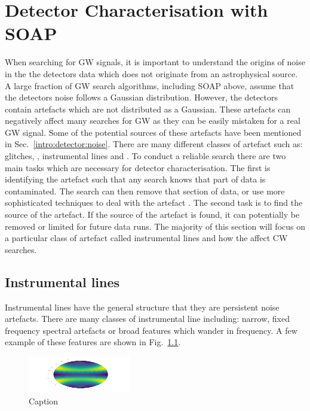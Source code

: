 \chapter{\label{detchar}Detector Characterisation with SOAP}

When searching for \ac{GW} signals, it is important to understand the origins of noise in the the detectors data which does not originate from an astrophysical source.
A large fraction of \ac{GW} search algorithms, including SOAP above, assume that the detectors noise follows a Gaussian distribution.
However, the detectors contain artefacts which are not distributed as a Gaussian. 
These artefacts can negatively affect many searches for \ac{GW} as they can be easily mistaken for a real \ac{GW} signal.
Some of the potential sources of these artefacts have been mentioned in Sec.~\ref{intro:detector:noise}. 
There are many different classes of artefact such as: glitches, , instrumental lines and .
To conduct a reliable search there are two main tasks which are necessary for detector characterisation.
The first is identifying the artefact such that any search knows that part of data is contaminated.
The search can then remove that section of data, or use more sophisticated techniques to deal with the artefact \citep{}.
The second task is to find the source of the artefact. 
If the source of the artefact is found, it can potentially be removed or limited for future data runs.
The majority of this section will focus on a particular class of artefact called instrumental lines and how the affect \ac{CW} searches.





\section{Instrumental lines}

Instrumental lines have the general structure that they are persistent noise artefacts.
There are many classes of instrumental line including: narrow, fixed frequency spectral artefacts or broad features which wander in frequency.
A few example of these features are shown in Fig.~\ref{}. 

\begin{figure}
    \centering
    \includegraphics[width=\textwidth]{testimg.png}
    \caption{Caption}
    \label{fig:my_label}
\end{figure}

